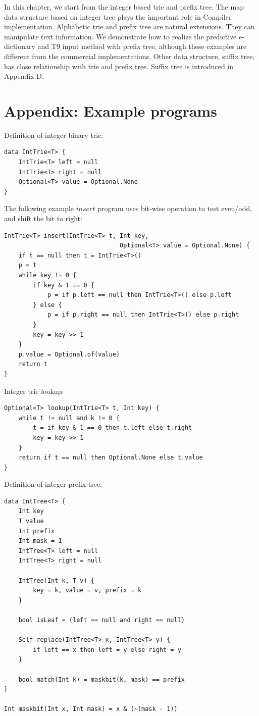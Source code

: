 \documentclass[b5paper]{article}
\begin{document}
In this chapter, we start from the integer based trie and prefix tree. The
map data structure based on integer tree plays the important role
in Compiler implementation. Alphabetic trie and prefix tree are
natural extensions. They can manipulate text information.
We demonstrate how to realize the predictive e-dictionary
and T9 input method with prefix tree, although these examples
are different from the commercial implementations.
Other data structure, suffix tree, has close
relationship with trie and prefix tree. Suffix tree is introduced
in Appendix D.

\section{Appendix: Example programs}

Definition of integer binary trie:

\begin{lstlisting}[language = Bourbaki]
data IntTrie<T> {
    IntTrie<T> left = null
    IntTrie<T> right = null
    Optional<T> value = Optional.None
}
\end{lstlisting}

The following example $insert$ program uses bit-wise operation to test even/odd, and shift the bit to right:

\begin{lstlisting}[language = Bourbaki]
IntTrie<T> insert(IntTrie<T> t, Int key,
                                Optional<T> value = Optional.None) {
    if t == null then t = IntTrie<T>()
    p = t
    while key != 0 {
        if key & 1 == 0 {
            p = if p.left == null then IntTrie<T>() else p.left
        } else {
            p = if p.right == null then IntTrie<T>() else p.right
        }
        key = key >> 1
    }
    p.value = Optional.of(value)
    return t
}
\end{lstlisting}

Integer trie lookup:

\begin{lstlisting}[language = Bourbaki]
Optional<T> lookup(IntTrie<T> t, Int key) {
    while t != null and k != 0 {
        t = if key & 1 == 0 then t.left else t.right
        key = key >> 1
    }
    return if t == null then Optional.None else t.value
}
\end{lstlisting}

Definition of integer prefix tree:

\begin{lstlisting}[language = Bourbaki]
data IntTree<T> {
    Int key
    T value
    Int prefix
    Int mask = 1
    IntTree<T> left = null
    IntTree<T> right = null

    IntTree(Int k, T v) {
        key = k, value = v, prefix = k
    }

    bool isLeaf = (left == null and right == null)

    Self replace(IntTree<T> x, IntTree<T> y) {
        if left == x then left = y else right = y
    }

    bool match(Int k) = maskbit(k, mask) == prefix
}

Int maskbit(Int x, Int mask) = x & (~(mask - 1))
\end{lstlisting}
\end{document}

